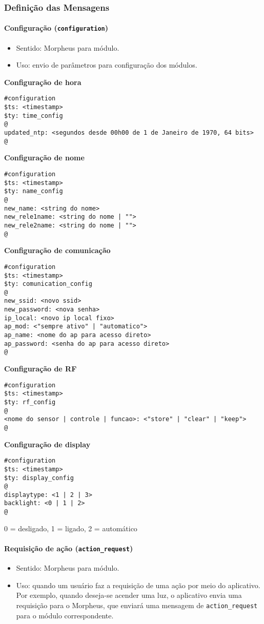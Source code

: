 \subsubsection{Definição das Mensagens}

\paragraph{Configuração (\texttt{configuration})}
\begin{itemize}
\item Sentido: Morpheus para módulo.
\item Uso: envio de parâmetros para configuração dos módulos.
\end{itemize}

\textbf{Configuração de hora}
\begin{lstlisting}
#configuration
$ts: <timestamp>
$ty: time_config
@
updated_ntp: <segundos desde 00h00 de 1 de Janeiro de 1970, 64 bits>
@
\end{lstlisting}

\textbf{Configuração de nome}
\begin{lstlisting}
#configuration
$ts: <timestamp>
$ty: name_config
@
new_name: <string do nome>
new_rele1name: <string do nome | "">
new_rele2name: <string do nome | "">
@
\end{lstlisting}

\textbf{Configuração de comunicação}
\begin{lstlisting}
#configuration
$ts: <timestamp>
$ty: comunication_config
@
new_ssid: <novo ssid>
new_password: <nova senha>
ip_local: <novo ip local fixo>
ap_mod: <"sempre ativo" | "automatico">
ap_name: <nome do ap para acesso direto>
ap_password: <senha do ap para acesso direto>
@
\end{lstlisting}

\textbf{Configuração de RF}
\begin{lstlisting}
#configuration
$ts: <timestamp>
$ty: rf_config
@
<nome do sensor | controle | funcao>: <"store" | "clear" | "keep">
@
\end{lstlisting}

\textbf{Configuração de display}
\begin{lstlisting}
#configuration
$ts: <timestamp>
$ty: display_config
@
displaytype: <1 | 2 | 3>
backlight: <0 | 1 | 2>
@
\end{lstlisting}
0 = desligado, 1 = ligado, 2 = automático

\paragraph{Requisição de ação (\texttt{action\_request})}
\begin{itemize}
\item Sentido: Morpheus para módulo.
\item Uso: quando um usuário faz a requisição de uma ação por meio do aplicativo. Por exemplo, quando deseja-se acender uma luz, o aplicativo envia uma requisição para o Morpheus, que enviará uma mensagem de \texttt{action\_request} para o módulo correspondente.
\end{itemize}

